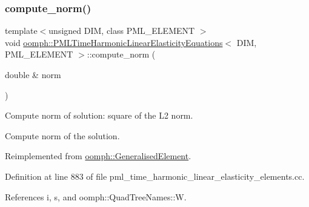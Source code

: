 \subsubsection{\texorpdfstring{compute\+\_\+norm()}{compute\_norm()}}
{\footnotesize\ttfamily template$<$unsigned D\+IM, class P\+M\+L\+\_\+\+E\+L\+E\+M\+E\+NT $>$ \\
void \hyperlink{classoomph_1_1PMLTimeHarmonicLinearElasticityEquations}{oomph\+::\+P\+M\+L\+Time\+Harmonic\+Linear\+Elasticity\+Equations}$<$ D\+IM, P\+M\+L\+\_\+\+E\+L\+E\+M\+E\+NT $>$\+::compute\+\_\+norm (\begin{DoxyParamCaption}\item[{double \&}]{norm }\end{DoxyParamCaption})\hspace{0.3cm}{\ttfamily [virtual]}}



Compute norm of solution\+: square of the L2 norm. 

Compute norm of the solution. 

Reimplemented from \hyperlink{classoomph_1_1GeneralisedElement_af2025a472df6752a946739da58e7fb37}{oomph\+::\+Generalised\+Element}.



Definition at line 883 of file pml\+\_\+time\+\_\+harmonic\+\_\+linear\+\_\+elasticity\+\_\+elements.\+cc.



References i, s, and oomph\+::\+Quad\+Tree\+Names\+::W.

\mbox{\label{classoomph_1_1PMLTimeHarmonicLinearElasticityEquations_af058d2d4b1c5aa77f99a1609fbe69167}} 
